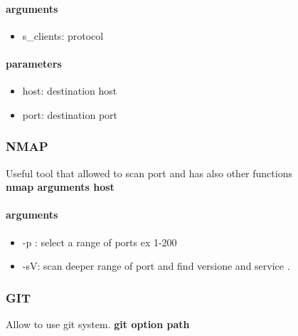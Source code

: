 \documentclass{article}
\begin{document}
                    \paragraph{arguments}
                    \begin{itemize}
                        \item s\_clients: protocol
                    \end{itemize}
                    \paragraph{parameters}
                    \begin{itemize}
                        \item host: destination host
                        \item port: destination port
                    \end{itemize}
                \subsubsection{NMAP}
                    Useful tool that allowed to scan port and has also other functions\\
                    \textbf{nmap arguments host}
                    \paragraph{arguments}
                    \begin{itemize}
                        \item -p : select a range of ports ex 1-200
                        \item -sV: scan deeper range of port and find versione and service . 
                    \end{itemize}
            \subsubsection{GIT}
                    Allow to use git system. \textbf{git option path}
\end{document}
